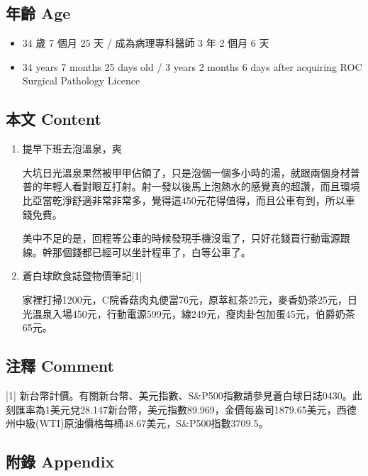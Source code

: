 \documentclass[a5paper, 11pt
]{book}
\providecommand{\tightlist}{%
  \setlength{\itemsep}{0pt}\setlength{\parskip}{0pt}}
\begin{document}
\hypertarget{ux5e74ux9f61-age-17}{%
\subsection{年齡 Age}\label{ux5e74ux9f61-age-17}}

\begin{itemize}
\tightlist
\item
  34 歲 7 個月 25 天 / 成為病理專科醫師 3 年 2 個月 6 天
\item
  34 years 7 months 25 days old / 3 years 2 months 6 days after
  acquiring ROC Surgical Pathology Licence
\end{itemize}

\hypertarget{ux672cux6587-content-17}{%
\subsection{本文 Content}\label{ux672cux6587-content-17}}

\begin{enumerate}
\def\labelenumi{\arabic{enumi}.}
\item
  提早下班去泡溫泉，爽

  大坑日光溫泉果然被甲甲佔領了，只是泡個一個多小時的湯，就跟兩個身材普普的年輕人看對眼互打射。射一發以後馬上泡熱水的感覺真的超讚，而且環境比亞當乾淨舒適非常非常多，覺得這450元花得值得，而且公車有到，所以車錢免費。

  美中不足的是，回程等公車的時候發現手機沒電了，只好花錢買行動電源跟線。幹那個錢都已經可以坐計程車了，白等公車了。
\item
  蒼白球飲食誌暨物價筆記{[}1{]}

  家裡打掃1200元，C院香菇肉丸便當76元，原萃紅茶25元，麥香奶茶25元，日光溫泉入場450元，行動電源599元，線249元，瘦肉卦包加蛋45元，伯爵奶茶65元。
\end{enumerate}

\hypertarget{ux6ce8ux91cb-comment-17}{%
\subsection{注釋 Comment}\label{ux6ce8ux91cb-comment-17}}

{[}1{]}
新台幣計價。有關新台幣、美元指數、S\&P500指數請參見蒼白球日誌0430。此刻匯率為1美元兌28.147新台幣，美元指數89.969，金價每盎司1879.65美元，西德州中級(WTI)原油價格每桶48.67美元，S\&P500指數3709.5。

\hypertarget{ux9644ux9304-appendix-17}{%
\subsection{附錄 Appendix}\label{ux9644ux9304-appendix-17}}
\end{document}
